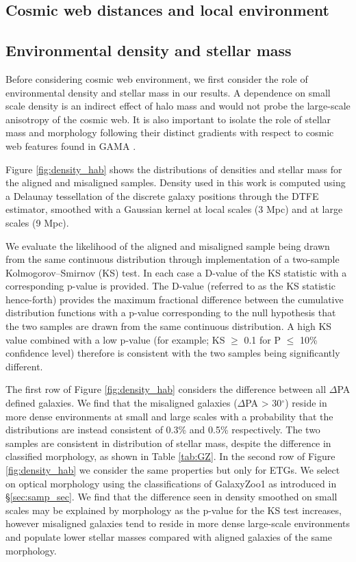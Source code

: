 \subsection{Cosmic web distances and local environment} \label{sec:cosmo_web_distances}
\subsection{Environmental density and stellar mass}
Before considering cosmic web environment, we first consider the role of environmental density and stellar mass in our results. A dependence on small scale density is an indirect effect of halo mass and would not probe the large-scale anisotropy of the cosmic web. It is also important to isolate the role of stellar mass and morphology following their distinct gradients with respect to cosmic web features found in GAMA \citep{kraljic2018}.

Figure \ref{fig:density_hab} shows the distributions of densities and stellar mass for the aligned and misaligned samples. Density used in this work is computed using a Delaunay tessellation of the discrete galaxy positions through the DTFE estimator, smoothed with a Gaussian kernel at local scales (3 Mpc) and at large scales (9 Mpc). 

We evaluate the likelihood of the aligned and misaligned sample being drawn from the same continuous distribution through implementation of a two-sample Kolmogorov--Smirnov (KS) test. In each case a D-value of the KS statistic with a corresponding p-value is provided. The D-value (referred to as the KS statistic hence-forth) provides the maximum fractional difference between the cumulative distribution functions with a p-value corresponding to the null hypothesis that the two samples are drawn from the same continuous distribution. A high KS value combined with a low p-value (for example; KS $\geq$ 0.1 for P $\leq$ 10\% confidence level) therefore is consistent with the two samples being significantly different.

The first row of Figure \ref{fig:density_hab} considers the difference between all $\Delta$PA defined galaxies. We find that the misaligned galaxies ($\Delta$PA > 30$^{\circ}$) reside in more dense environments at small and large scales with a probability that the distributions are instead consistent of 0.3\% and 0.5\% respectively. The two samples are consistent in distribution of stellar mass, despite the difference in classified morphology, as shown in Table \ref{tab:GZ}. In the second row of Figure \ref{fig:density_hab} we consider the same properties but only for ETGs. We select on optical morphology using the classifications of GalaxyZoo1 as introduced in \S\ref{sec:samp_sec}. We find that the difference seen in density smoothed on small scales may be explained by morphology as the p-value for the KS test increases, however misaligned galaxies tend to reside in more dense large-scale environments and populate lower stellar masses compared with aligned galaxies of the same morphology.

